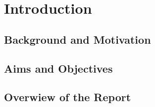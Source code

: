 \chapter{Introduction}

\section{Background and Motivation}

\section{Aims and Objectives}

\section{Overwiew of the Report}
